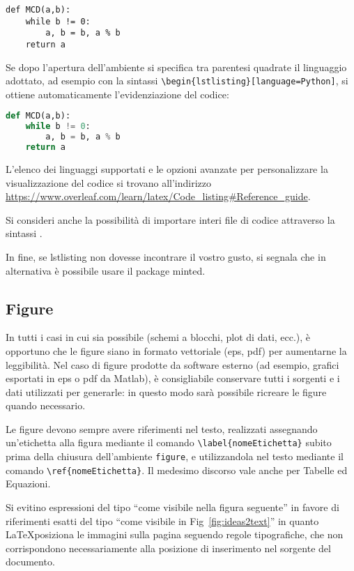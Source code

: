 \documentclass[12pt]{report}
\begin{document}
\begin{lstlisting}
def MCD(a,b):
    while b != 0:
        a, b = b, a % b
    return a
\end{lstlisting}

Se dopo l'apertura dell'ambiente si specifica tra parentesi quadrate il linguaggio adottato, ad esempio con la sintassi \verb|\begin{lstlisting}[language=Python]|, si ottiene automaticamente l'evidenziazione del codice:

\begin{lstlisting}[language=Python]
def MCD(a,b):
    while b != 0:
        a, b = b, a % b
    return a
\end{lstlisting}

L'elenco dei linguaggi supportati e le opzioni avanzate per personalizzare la visualizzazione del codice si trovano all'indirizzo \url{https://www.overleaf.com/learn/latex/Code_listing#Reference_guide}.

Si consideri anche la possibilità di importare interi file di codice attraverso la sintassi \verb||.

In fine, se lstlisting non dovesse incontrare il vostro gusto, si segnala che in alternativa è possibile usare il package minted.

\subsection{Figure}

In tutti i casi in cui sia possibile (schemi a blocchi, plot di dati, ecc.), \`e opportuno che le figure siano in formato vettoriale (eps, pdf) per aumentarne la leggibilit\`a.
Nel caso di figure prodotte da software esterno (ad esempio, grafici esportati in eps o pdf da Matlab), \`e consigliabile conservare tutti i sorgenti e i dati utilizzati per generarle: in questo modo sarà possibile ricreare le figure quando necessario.

Le figure devono sempre avere riferimenti nel testo, realizzati assegnando un'etichetta alla figura mediante il comando \verb|\label{nomeEtichetta}| subito prima della chiusura dell'ambiente \verb|figure|, e utilizzandola nel testo mediante il comando \verb|\ref{nomeEtichetta}|. Il medesimo discorso vale anche per Tabelle ed Equazioni.

Si evitino espressioni del tipo ``come visibile nella figura seguente'' in favore di riferimenti esatti del tipo ``come visibile in Fig~\ref{fig:ideas2text}'' in quanto \LaTeX posiziona le immagini sulla pagina seguendo regole tipografiche, che non corrispondono necessariamente alla posizione di inserimento nel sorgente del documento.
\end{document}
